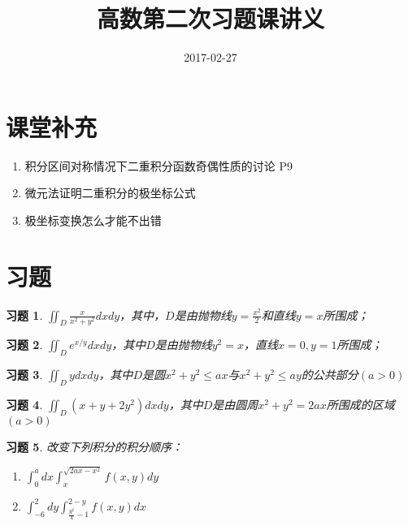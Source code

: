 \documentclass[a4paper, UTF8]{ctexart}
\title{高数第二次习题课讲义}
\date{2017-02-27}
\newtheorem{exercise}{习题}
\begin{document}
\maketitle
\section{课堂补充}
\label{sec:课堂补充}
\begin{enumerate}
	\item 积分区间对称情况下二重积分函数奇偶性质的讨论 P9
	\item 微元法证明二重积分的极坐标公式
	\item 极坐标变换怎么才能不出错
\end{enumerate}	
\section{习题}
\label{sec:习题}
\begin{exercise}
	$\iint_D \frac{x}{x^2 + y^2}dxdy$，其中，$D$是由抛物线$y=\frac{x^2}{2}$和直线$y=x$所围成；
\end{exercise}
\begin{exercise}
	$\iint_D e^{x/y}dxdy$，其中$D$是由抛物线$y^2=x$，直线$x=0,y=1$所围成；
\end{exercise}
\begin{exercise}
	$\iint_D ydxdy$，其中$D$是圆$x^2 + y^2 \le ax$与$x^2 +y^2 \le ay$的公共部分$\left( a>0 \right)$
\end{exercise}
\begin{exercise}
	$\iint_D \left( x+y+2y^2 \right)dxdy$，其中$D$是由圆周$x^2+y^2=2ax$所围成的区域$\left( a>0 \right)$
\end{exercise}
\begin{exercise}
	改变下列积分的积分顺序：\\
	\begin{enumerate}
		\item $\int_0^adx\int_x^{\sqrt{2ax-x^2}}f \left( x,y \right)dy$
		\item $\int_{-6}^2dy\int_{\frac{y^2}{4}-1}^{2-y}f \left( x,y \right)dx$
	\end{enumerate}
\end{exercise}
\end{document}
